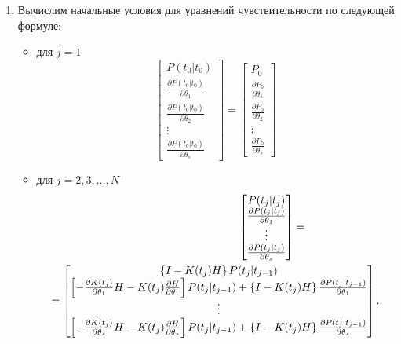 \documentclass[a4paper,14pt]{extarticle}
\newcommand{\pd}[2]{\frac{\partial #1}{\partial #2}}
\begin{document}
\begin{enumerate}
\item Вычислим начальные условия для уравнений чувствительности по следующей
	формуле:
\begin{itemize}
		\item для $j=1$
\begin{equation}
	\label{eq:init_cond_1}
	\begin{bmatrix} 
		P(t_0|t_0) \\ 
		\pd{P(t_0|t_0)}{\theta_1} \\
		\pd{P(t_0|t_0)}{\theta_2} \\
		\vdots \\
		\pd{P(t_0|t_0)}{\theta_s}
	\end{bmatrix} =
	\begin{bmatrix}
		P_0 \\
		\pd{P_0}{\theta_1} \\
		\pd{P_0}{\theta_2} \\
		\vdots \\
		\pd{P_0}{\theta_s}
	\end{bmatrix}
\end{equation}
\item для $j=2,3,\ldots,N$
	\begin{multline}
		\label{eq:init_cond_2}
		\hspace{0.3\textwidth}
		\begin{bmatrix}
			P(t_j|t_j) \\
			\pd{P(t_j|t_j)}{\theta_1} \\
			\vdots \\
			\pd{P(t_j|t_j)}{\theta_s}
		\end{bmatrix} = \\ =
	  \begin{bmatrix}
			\left\{ I - K(t_j) H \right\} P(t_j|t_{j-1}) \\ 
			\left[
				-\pd{K(t_j)}{\theta_1} H - K(t_j) \pd{H}{\theta_1} \right]
			P(t_j|t_{j-1}) + \left\{ I - K(t_j) H \right\}
			\pd{P(t_j|t_{j-1})}{\theta_1} \\
			\vdots \\
			\left[
				-\pd{K(t_j)}{\theta_s} H - K(t_j) \pd{H}{\theta_s} \right]
			P(t_j|t_{j-1}) + \left\{ I - K(t_j) H \right\}
			\pd{P(t_j|t_{j-1})}{\theta_s} 
		\end{bmatrix}.
	\end{multline}
\end{itemize}


\end{enumerate}
\end{document}
